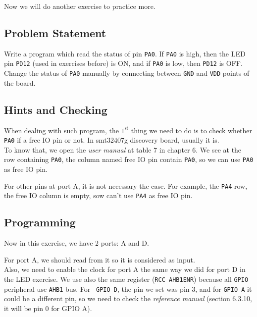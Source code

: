 Now we will do another exercise to practice more.

\subsection{Problem Statement}

Write a program which read the status of pin \verb|PA0|. If \verb|PA0| is high, then the LED pin \verb|PD12| (used in exercises before) is ON, and if \verb|PA0| is low, then \verb|PD12| is OFF.\\

Change the status of \verb|PA0| manually by connecting between \verb|GND| and \verb|VDD| points of the board.

\subsection{Hints and Checking}

When dealing with such program, the $1^\mathrm{st}$ thing we need to do is to check whether \verb|PA0| if a free IO pin or not. In smt32407g discovery board, usually it is. \\

To know that, we open the \textit{user manual} at table 7 in chapter 6. We see at the row containing \verb|PA0|, the column named free IO pin contain \verb|PA0|, so we can use \verb|PA0| as free IO pin.

For other pins at port A, it is not necessary the case. For example, the \verb|PA4| row, the free IO column is empty, sow can't use \verb|PA4| as free IO pin.

\subsection{Programming}

Now in this exercise, we have 2 ports: A and D. 

For port A, we should read from it so it is considered as input.\\

Also, we need to enable the clock for port A the same way we did for port D in the LED exercise. We use also the same register (\verb|RCC AHB1ENR|) because all \verb|GPIO| peripheral use \verb|AHB1| bus. For \verb| GPIO D|, the pin we set was pin 3, and for \verb|GPIO A| it could be a different pin, so we need to check the \textit{reference manual} (section 6.3.10, it will be pin 0 for GPIO A).\\

